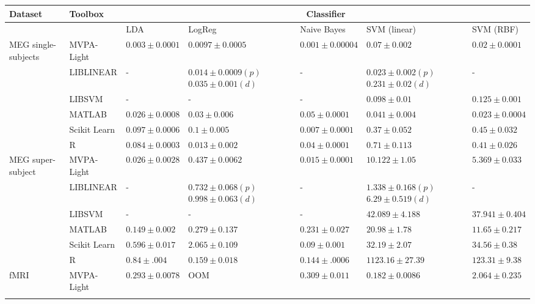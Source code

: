 \documentclass[utf8]{frontiersSCNS} %
\begin{document}
\begin{table}
\footnotesize
\begin{tabular}{ |p{1.1cm}|p{1.4cm}|p{2cm}|p{2.1cm}|p{2cm}|p{2.1cm}|p{2cm}|}
 \hline
 Dataset & Toolbox & \multicolumn{5}{c}{Classifier}\\ \hline
\multicolumn{2}{|c|}{}  & LDA & LogReg & Naive Bayes & SVM (linear) & SVM (RBF)\\
 \hline
\multirow{6}{1.3cm}{MEG single-subjects} & MVPA-Light & $\mathbf{0.003}\pm 0.0001$ & $\mathbf{0.0097}\pm0.0005$ & $\mathbf{0.001}\pm0.00004$ & $0.07\pm0.002$ & $\mathbf{0.02}\pm0.0001$\\
\cline{2-7}
  & LIBLINEAR & - & $0.014\pm0.0009(p)$ $0.035\pm0.001 (d)$ & - & $\mathbf{0.023}\pm0.002(p)$ $0.231\pm0.02(d)$ & -\\
\cline{2-7}
  & LIBSVM & - & - & - & $0.098\pm0.01$ & $0.125\pm0.001$\\
\cline{2-7}
  & MATLAB & $0.026\pm0.0008$ & $0.03\pm0.006$ & $0.05\pm0.0001$ & $0.041\pm0.004$ & $0.023\pm0.0004$\\
\cline{2-7}
   & Scikit Learn & $0.097\pm0.0006$ & $0.1\pm0.005$ & $0.007\pm0.0001$ & $0.37\pm0.052$ & $0.45\pm0.032$\\
\cline{2-7}
  & R & $0.084\pm 0.0003$ & $0.013\pm0.002$ & $0.04\pm0.0001$ & $0.71\pm0.113$ & $0.41\pm0.026$ \\\hline
 \hline
 \multirow{6}{1.3cm}{MEG super-subject} & MVPA-Light & $\mathbf{0.026}\pm0.0028$ & $0.437\pm0.0062$ & $\mathbf{0.015}\pm0.0001$ & $10.122\pm1.05$ & $\mathbf{5.369}\pm0.033$\\
\cline{2-7}
  & LIBLINEAR & - & $0.732\pm0.068(p)$ $0.998\pm0.063(d)$& - & $\mathbf{1.338}\pm0.168(p)$ $6.29\pm0.519(d)$& -\\
\cline{2-7}
  & LIBSVM & - & - & - & $42.089\pm4.188$ & $37.941\pm0.404$\\
\cline{2-7}
  & MATLAB & $0.149\pm0.002$ & $0.279\pm0.137$ & $0.231\pm0.027$ & $20.98\pm1.78$ & $11.65\pm0.217$\\
\cline{2-7}
   & Scikit Learn & $0.596\pm0.017$ & $2.065\pm0.109$ & $0.09\pm0.001$ & $32.19\pm2.07$& $34.56\pm0.38$\\
\cline{2-7}
  & R & $0.84\pm.004$ & $\mathbf{0.159}\pm0.018$ & $0.144\pm.0006$ & $1123.16\pm27.39$ & $123.31\pm9.38$\\\hline
  \hline
\multirow{6}{1.3cm}{fMRI} & MVPA-Light & $\mathbf{0.293}\pm0.0078$ & OOM & $\mathbf{0.309}\pm0.011$ & $\mathbf{0.182}\pm0.0086$ & $\mathbf{2.064}\pm0.235$\\
\cline{2-7}

\end{tabular}
\end{table}
\end{document}
